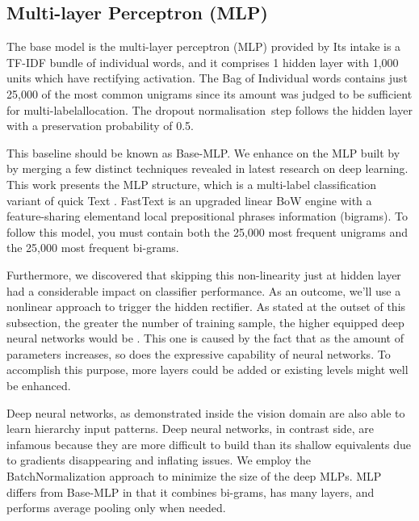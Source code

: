 \documentclass[a4paper]{article}
\begin{document}
\subsection{Multi-layer Perceptron (MLP)}

The base model is the multi-layer perceptron (MLP) provided by \cite{zhang20217} Its intake is a TF-IDF \cite{zouaq2012voting} bundle of individual words, and it comprises 1 hidden layer with 1,000 units which have rectifying activation. The Bag of Individual words contains just 25,000 of the most common unigrams since its amount was judged to be sufficient for multi-labelallocation. The dropout\cite{li2016weighted} normalisation step follows the hidden layer with a preservation probability of 0.5.


This baseline should be known as Base-MLP. We enhance on the MLP built by \cite{zhang20217} by merging a few distinct techniques revealed in latest research on deep learning. This work presents the MLP structure, which is a multi-label classification variant of quick Text \cite{yao2014reader}. FastText is an upgraded linear BoW engine with a feature-sharing elementand local prepositional phrases information (bigrams). To follow this model, you must contain both the 25,000 most frequent unigrams and the 25,000 most frequent bi-grams.


Furthermore, we discovered that skipping this non-linearity just at hidden layer had a considerable impact on classifier performance. As an outcome, we'll use a nonlinear approach to trigger the hidden rectifier. As stated at the outset of this subsection, the greater the number of training sample, the higher equipped deep neural networks would be \cite{tuarob2013automatic}. This one is caused by the fact that as the amount of parameters increases, so does the expressive capability of neural networks. To accomplish this purpose, more layers could be added or existing levels might well be enhanced.


Deep neural networks, as demonstrated inside the vision domain \cite{collins2002discriminative} are also able to learn hierarchy input patterns. Deep neural networks, in contrast side, are infamous because they are more difficult to build than its shallow equivalents due to gradients disappearing and inflating issues. We employ the BatchNormalization \cite{zhang20217} approach to minimize the size of the deep MLPs. MLP differs from Base-MLP in that it combines bi-grams, has many layers, and performs average pooling only when needed.
\end{document}
